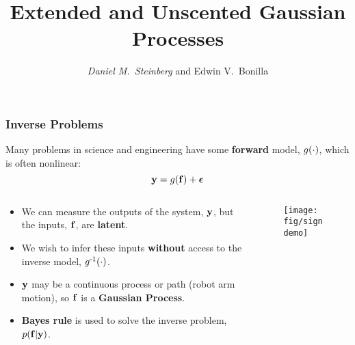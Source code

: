 \documentclass{beamer}
\begin{document}

\title[Extended and Unscented GPs]{Extended and Unscented Gaussian Processes}
\author[D. Steinberg \& E. Bonilla]{\textit{Daniel M.\ Steinberg} and
        Edwin V.\ Bonilla}

\date{}


\begin{frame}
    \titlepage
\end{frame}



\begin{frame}
    \frametitle{Inverse Problems}

Many problems in science and engineering have some \textbf{forward} 
model, $g\!\left({{\cdot}}\right)$, which is often nonlinear:
\begin{equation*}
    \mathbf{y} = g\!\left({{\mathbf{f}}}\right) + \boldsymbol\epsilon
\end{equation*}
\vspace{-6mm}
\begin{columns}

\begin{column}{0.5\linewidth}
\footnotesize

\begin{itemize}
    \item We can measure the outputs of the system, $\mathbf{y}$, but the inputs,
        $\mathbf{f}$, are \textbf{latent}.
    \item We wish to infer these inputs \textbf{without} access to the inverse
        model, $g^{\text{-}1}\!\left({{\cdot}}\right)$.
    \item $\mathbf{y}$ may be a continuous process or path (robot arm motion), 
        so $\mathbf{f}$ is a \textbf{Gaussian Process}.
    \item \textbf{Bayes rule} is used to solve the inverse problem,
        $p\!\left({\mathbf{f}}\middle\vert{\ensuremath{\mathbf{y}}}\right)$.
\end{itemize}

\end{column}

\begin{column}{0.5\linewidth}

\begin{figure}
    \texttt{[image: fig/signdemo]}


\end{figure}
\end{column}
\end{columns}
\end{frame}
\end{document}
